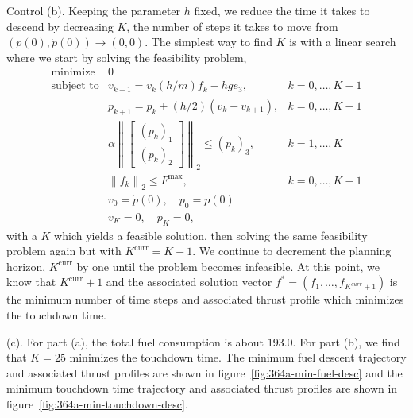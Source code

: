 \begin{chapter}{Control}
    \vspace{0.1cm}
    \noindent (b). Keeping the parameter $h$ fixed, we reduce the time it takes to descend by decreasing $K$,
    the number of steps it takes to move from $(p(0), \dot{p}(0)) \to (0, 0)$. The simplest way 
    to find $K$ is with a linear search where we start by solving the feasibility problem,
    \[\begin{array}{lll}
        \text{minimize} \; & 0 & \\
        \text{subject to} & v_{k+1} = v_k (h/m)f_k - hge_3, & k = 0, \ldots, K-1 \\
        & p_{k+1} = p_k + (h/2)(v_k + v_{k+1}), & k = 0, \ldots, K-1 \\
        & \alpha \left\lVert \begin{bmatrix} (p_k)_1 \\ (p_k)_2 \end{bmatrix} \right\rVert_{2} \le (p_k)_3, & k=1, \ldots, K \\
        & \left\lVert f_k \right\rVert_{2} \le F^{\mathrm{max}}, & k = 0, \ldots, K-1 \\
        & v_{0} = \dot{p}(0), \quad p_0 = p(0) & \\
        & v_{K} = 0, \quad p_{K} = 0,
        \end{array}\]
    with a $K$ which yields a feasible solution, then solving the same feasibility problem again but
    with $K^{\mathrm{curr}} = K-1$. We continue to decrement the planning horizon, $K^{\mathrm{curr}}$ by one until the problem becomes infeasible.
    At this point, we know that $K^{\mathrm{curr}} + 1$ and the associated solution vector $f^{*} = (f_1, \ldots, f_{K^{curr}+1})$ 
    is the minimum number of time steps and associated thrust profile which minimizes the touchdown time.

    \vspace{0.1cm}
    \noindent (c). For part (a), the total fuel consumption is about $193.0$. For part (b),
    we find that $K=25$ minimizes the touchdown time. The minimum fuel descent trajectory
    and associated thrust profiles are shown in figure~\ref{fig:364a-min-fuel-desc}
    and the minimum touchdown time trajectory and associated thrust profiles are shown in figure~\ref{fig:364a-min-touchdown-desc}.


\end{chapter}
